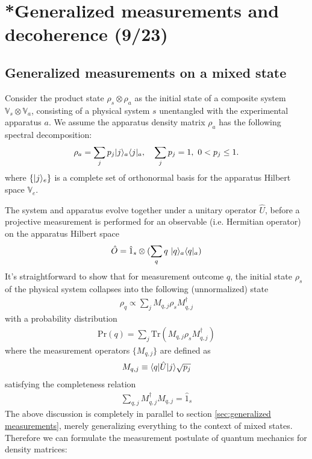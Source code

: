 \section{*Generalized measurements and decoherence (9/23)}


\subsection{Generalized measurements on a mixed state}

Consider the product state $\rho_s\otimes\rho_a$ as the initial state of a composite system $\mathbb{V}_s\otimes\mathbb{V}_a$, consisting of a physical system $s$ unentangled with the experimental apparatus $a$. We assume the apparatus density matrix $\rho_a$ has the following spectral decomposition:
\begin{align}
    \rho_a=\sum_jp_j|{j}\rangle_a\langle{j}|_a,~~~\sum_jp_j=1,~0<p_j\leq1.
\end{align}
where $\{|{j}\rangle_e\}$ is a complete set of orthonormal basis for the apparatus Hilbert space $\mathbb{V}_e$. 

The system and apparatus evolve together under a unitary operator $\hat U$, before a projective measurement is performed for an observable (i.e. Hermitian operator) on the apparatus Hilbert space
\begin{align}
    \hat O=\hat 1_s\otimes(\sum_qq~|{q}\rangle_a\langle{q}|_a)
\end{align}
It's straightforward to show that for measurement outcome $q$, the initial state $\rho_s$ of the physical system collapses into the following (unnormalized) state
\begin{align}
    \rho_q\propto\sum_j M_{q,j}\rho_sM^\dagger_{q,j}
\end{align}
with a probability distribution
\begin{align}
    \text{Pr}(q)=\sum_j\text{Tr}(M_{q,j}\rho_sM^\dagger_{q,j})
\end{align}
where the measurement operators $\{M_{q,j}\}$ are defined as
\begin{align}
    M_{q,j}\equiv\langle{q|\hat U|j}\rangle\sqrt{p_j}
\end{align}
satisfying the completeness relation
\begin{align}
    \sum_{q,j}M^\dagger_{q,j}M_{q,j}=\hat1_s
\end{align}
The above discussion is completely in parallel to section \ref{sec:generalized measurements}, merely generalizing everything to the context of mixed states. Therefore we can formulate the measurement postulate of quantum mechanics for density matrices:

